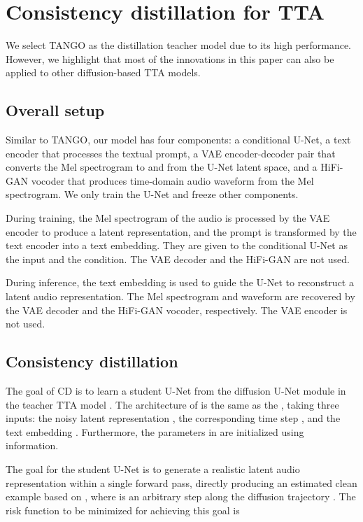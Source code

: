 \documentclass{article}
\begin{document}
\section{Consistency distillation for TTA} \label{sec:methods}

We select TANGO \cite{tango} as the distillation teacher model due to its high performance. However, we highlight that most of the innovations in this paper can also be applied to other diffusion-based TTA models.


\subsection{Overall setup}

Similar to TANGO, our model has four components: a conditional U-Net, a text encoder that processes the textual prompt, a VAE encoder-decoder pair that converts the Mel spectrogram to and from the U-Net latent space, and a HiFi-GAN vocoder \cite{hifigan} that produces time-domain audio waveform from the Mel spectrogram. We only train the U-Net and freeze other components.

During training, the Mel spectrogram of the audio is processed by the VAE encoder to produce a latent representation, and the prompt is transformed by the text encoder into a text embedding. They are given to the conditional U-Net as the input and the condition. The VAE decoder and the HiFi-GAN are not used.

During inference, the text embedding is used to guide the U-Net to reconstruct a latent audio representation. The Mel spectrogram and waveform are recovered by the VAE decoder and the HiFi-GAN vocoder, respectively. The VAE encoder is not used.


\subsection{Consistency distillation}

The goal of CD is to learn a student U-Net  from the diffusion U-Net module in the teacher TTA model . The architecture of  is the same as the , taking three inputs: the noisy latent representation , the corresponding time step , and the text embedding . Furthermore, the parameters in  are initialized using  information.

The goal for the student U-Net is to generate a realistic latent audio representation within a single forward pass, directly producing an estimated clean example  based on , where  is an arbitrary step along the diffusion trajectory \cite[Algorithm 2]{cm}. The risk function to be minimized for achieving this goal is
\vspace{-.4mm}
\end{document}
